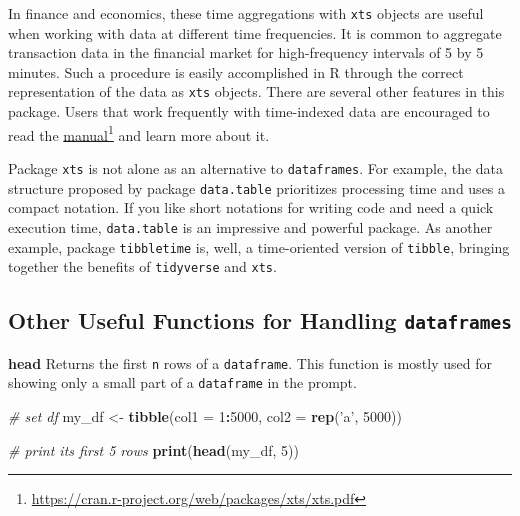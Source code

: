 \documentclass[
  12pt,
]{book}
\newenvironment{Shaded}{\begin{snugshade}}{\end{snugshade}}
\newcommand{\CommentTok}[1]{\textcolor[rgb]{0.37,0.37,0.37}{\textit{#1}}}
\newcommand{\DataTypeTok}[1]{\textcolor[rgb]{0.27,0.27,0.27}{#1}}
\newcommand{\DecValTok}[1]{\textcolor[rgb]{0.06,0.06,0.06}{#1}}
\newcommand{\KeywordTok}[1]{\textcolor[rgb]{0.27,0.27,0.27}{\textbf{#1}}}
\newcommand{\NormalTok}[1]{#1}
\newcommand{\OperatorTok}[1]{\textcolor[rgb]{0.43,0.43,0.43}{\textbf{#1}}}
\newcommand{\StringTok}[1]{\textcolor[rgb]{0.5,0.5,0.5}{#1}}
\begin{document}
In finance and economics, these time aggregations with \texttt{xts} objects are useful when working with data at different time frequencies. It is common to aggregate transaction data in the financial market for high-frequency intervals of 5 by 5 minutes. Such a procedure is easily accomplished in R through the correct representation of the data as \texttt{xts} objects. There are several other features in this package. Users that work frequently with time-indexed data are encouraged to read the \href{https://cran.r-project.org/web/packages/xts/xts.pdf}{manual}\footnote{\url{https://cran.r-project.org/web/packages/xts/xts.pdf}} and learn more about it.

Package \texttt{xts} is not alone as an alternative to \texttt{dataframes}. For example, the data structure proposed by package \texttt{data.table} \citep{R-data.table} prioritizes processing time and uses a compact notation. If you like short notations for writing code and need a quick execution time, \texttt{data.table} is an impressive and powerful package. As another example, package \texttt{tibbletime} \citep{R-tibbletime} is, well, a time-oriented version of \texttt{tibble}, bringing together the benefits of \texttt{tidyverse} and \texttt{xts}.  

\hypertarget{other-useful-functions-for-handling-dataframes}{%
\subsection{\texorpdfstring{Other Useful Functions for Handling \texttt{dataframes}}{Other Useful Functions for Handling dataframes}}\label{other-useful-functions-for-handling-dataframes}}

\textbf{head} Returns the first \texttt{n} rows of a \texttt{dataframe}. This function is mostly used for showing only a small part of a \texttt{dataframe} in the prompt. 

\begin{Shaded}
\begin{Highlighting}[]
\CommentTok{# set df}
\NormalTok{my_df <-}\StringTok{ }\KeywordTok{tibble}\NormalTok{(}\DataTypeTok{col1 =} \DecValTok{1}\OperatorTok{:}\DecValTok{5000}\NormalTok{, }
                \DataTypeTok{col2 =} \KeywordTok{rep}\NormalTok{(}\StringTok{'a'}\NormalTok{, }\DecValTok{5000}\NormalTok{))}

\CommentTok{# print its first 5 rows}
\KeywordTok{print}\NormalTok{(}\KeywordTok{head}\NormalTok{(my_df, }\DecValTok{5}\NormalTok{))}
\end{Highlighting}
\end{Shaded}
\end{document}
